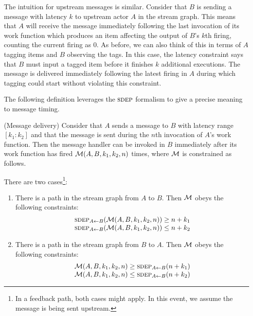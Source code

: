 The intuition for upstream messages is similar.  Consider that $B$ is
sending a message with latency $k$ to upstream actor $A$ in the stream
graph.  This means that $A$ will receive the message immediately
following the last invocation of its work function which produces an
item affecting the output of $B$'s $k$th firing, counting the current
firing as 0.  As before, we can also think of this in terms of $A$
tagging items and $B$ observing the tags.  In this case, the latency
constraint says that $B$ must input a tagged item before it finishes
$k$ additional executions.  The message is delivered immediately
following the latest firing in $A$ during which tagging could start
without violating this constraint.

The following definition leverages the $\textsc{sdep}$ formalism to give a
precise meaning to message timing.

\begin{definition}(Message delivery)
Consider that $A$ sends a message to $B$ with latency range
$[k_1:k_2]$ and that the message is sent during the $n$th invocation
of $A$'s work function.  Then the message handler can be invoked in
$B$ immediately after its work function has fired ${\cal M}(A, B, k_1,
k_2, n)$ times, where ${\cal M}$ is constrained as follows.

There are two cases\footnote{In a feedback path, both cases might apply.  In this event, we assume the message is being sent upstream.}:
\begin{enumerate}

\item There is a path in the stream graph from $A$ to $B$.  Then
${\cal M}$ obeys the following constraints:
\[
\begin{array}{l}
\sdepf{A}{B}({\cal M}(A, B, k_1, k_2, n)) \ge n+k_1\\
\sdepf{A}{B}({\cal M}(A, B, k_1, k_2, n)) \le n+k_2
\end{array}
\]

\item There is a path in the stream graph from $B$ to $A$.  Then
${\cal M}$ obeys the following constraints:
\[
\begin{array}{l}
{\cal M}(A, B, k_1, k_2, n) \ge \sdepf{A}{B}(n + k_1)\\
{\cal M}(A, B, k_1, k_2, n) \le \sdepf{A}{B}(n + k_2)
\end{array}
\]
\end{enumerate}
\end{definition}


